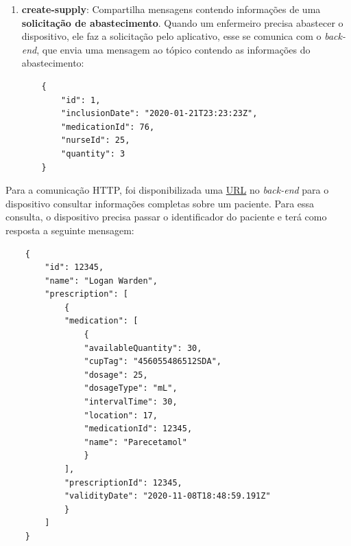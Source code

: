 \begin{enumerate}
    \item \textbf{create-supply}: Compartilha mensagens contendo informações de uma \textbf{solicitação de abastecimento}. Quando um enfermeiro precisa abastecer o dispositivo, ele faz a solicitação pelo aplicativo, esse se comunica com o \textit{back-end}, que envia uma mensagem ao tópico contendo as informações do abastecimento:
    
        \begin{verbatim}
    {
        "id": 1,
        "inclusionDate": "2020-01-21T23:23:23Z",
        "medicationId": 76,
        "nurseId": 25,
        "quantity": 3
    }
    \end{verbatim}
\end{enumerate}

Para a comunicação HTTP, foi disponibilizada uma \href{http://192.99.25.198:8082/swagger-ui.html#/Patient/getPatientDetails}{URL} no \textit{back-end} para o dispositivo consultar informações completas sobre um paciente. Para essa consulta, o dispositivo precisa passar o identificador do paciente e terá como resposta a seguinte mensagem:

        \begin{verbatim}
    {
        "id": 12345,
        "name": "Logan Warden",
        "prescription": [
            {
            "medication": [
                {
                "availableQuantity": 30,
                "cupTag": "456055486512SDA",
                "dosage": 25,
                "dosageType": "mL",
                "intervalTime": 30,
                "location": 17,
                "medicationId": 12345,
                "name": "Parecetamol"
                }
            ],
            "prescriptionId": 12345,
            "validityDate": "2020-11-08T18:48:59.191Z"
            }
        ]
    }
    \end{verbatim}